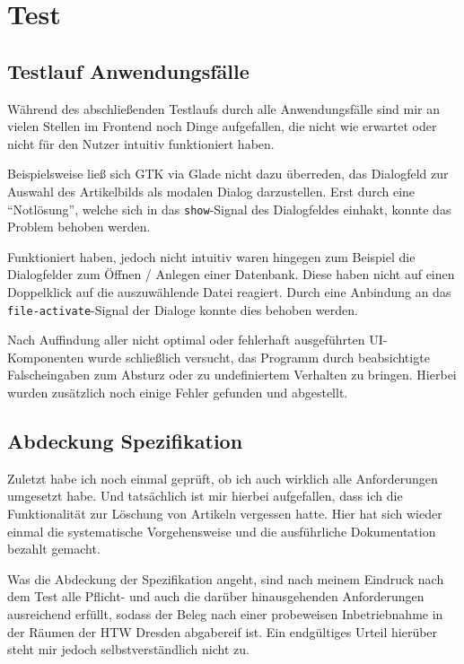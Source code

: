 \section{Test}

\subsection{Testlauf Anwendungsfälle}
Während des abschließenden Testlaufs durch alle Anwendungsfälle sind mir an vielen Stellen im Frontend noch Dinge
aufgefallen, die nicht wie erwartet oder nicht für den Nutzer intuitiv funktioniert haben.

Beispielsweise ließ sich GTK via Glade nicht dazu überreden, das Dialogfeld zur Auswahl des Artikelbilds als modalen
Dialog darzustellen. Erst durch eine ``Notlösung'', welche sich in das \lstinline{show}-Signal des Dialogfeldes
einhakt, konnte das Problem behoben werden.

Funktioniert haben, jedoch nicht intuitiv waren hingegen zum Beispiel die Dialogfelder zum Öffnen / Anlegen einer
Datenbank. Diese haben nicht auf einen Doppelklick auf die auszuwählende Datei reagiert. Durch eine Anbindung an das
\lstinline{file-activate}-Signal der Dialoge konnte dies behoben werden.

Nach Auffindung aller nicht optimal oder fehlerhaft ausgeführten UI-Komponenten wurde schließlich versucht, das
Programm durch beabsichtigte Falscheingaben zum Absturz oder zu undefiniertem Verhalten zu bringen. Hierbei wurden
zusätzlich noch einige Fehler gefunden und abgestellt.

\subsection{Abdeckung Spezifikation}
Zuletzt habe ich noch einmal geprüft, ob ich auch wirklich alle Anforderungen umgesetzt habe. Und tatsächlich ist mir
hierbei aufgefallen, dass ich die Funktionalität zur Löschung von Artikeln vergessen hatte.
Hier hat sich wieder einmal die systematische Vorgehensweise und die ausführliche Dokumentation bezahlt gemacht.

Was die Abdeckung der Spezifikation angeht, sind nach meinem Eindruck nach dem Test alle Pflicht- und auch die
darüber hinausgehenden Anforderungen ausreichend erfüllt, sodass der Beleg nach einer probeweisen Inbetriebnahme in
der Räumen der HTW Dresden abgabereif ist. Ein endgültiges Urteil hierüber steht mir jedoch selbstverständlich nicht zu.
